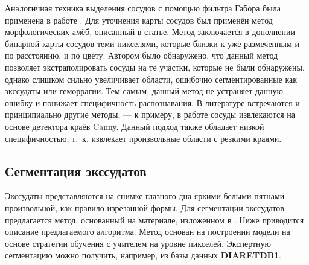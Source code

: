 \documentclass[12pt,fleqn]{article}
\begin{document}
Аналогичная техника выделения сосудов с помощью фильтра Габора была применена в работе \cite{chernomorets}. Для уточнения карты сосудов был применён метод морфологических амёб, описанный в статье. Метод заключается в дополнении бинарной карты сосудов теми пикселями, которые близки к уже размеченным и по расстоянию, и по цвету. Автором было обнаружено, что данный метод позволяет экстраполировать сосуды на те участки, которые не были обнаружены, однако слишком сильно увеличивает области, ошибочно сегментированные как экссудаты или геморрагии. Тем самым, данный метод не устраняет данную ошибку и понижает специфичность распознавания. В литературе встречаются и принципиально другие методы, --- к примеру, в работе \cite{choras} сосуды извлекаются на основе детектора краёв Canny. Данный подход также обладает низкой специфичностью, т.~к. извлекает произвольные области с резкими краями.

\subsection{Сегментация экссудатов} 
\label{section:exudates}

Экссудаты представляются на снимке глазного дна яркими белыми пятнами произвольной, как правило изрезанной формы. Для сегментации экссудатов предлагается метод, основанный на материале, изложенном в \cite{karegowda}. Ниже приводится описание предлагаемого алгоритма. Метод основан на построении модели на основе стратегии обучения с учителем на уровне пикселей. Экспертную сегментацию можно получить, например, из базы данных \textbf{DIARETDB1}.
\end{document}
